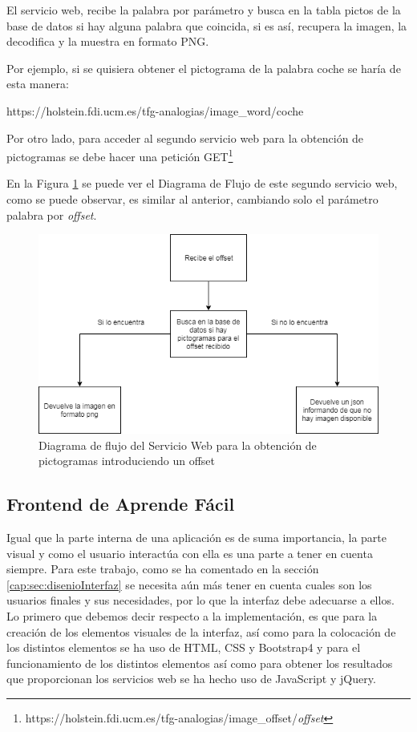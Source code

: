 El servicio web, recibe la palabra por parámetro y busca en la tabla pictos de la base de datos si hay alguna palabra que coincida, si es así, recupera la imagen, la decodifica y la muestra en formato PNG.

Por ejemplo, si se quisiera obtener el pictograma de la palabra coche se haría de esta manera:

https://holstein.fdi.ucm.es/tfg-analogias/image\_word/coche


Por otro lado, para acceder al segundo servicio web para la obtención de pictogramas se debe hacer una petición GET\footnote{https://holstein.fdi.ucm.es/tfg-analogias/image\_offset/\textit{offset}} 



En la Figura \ref{fig:swpictos_offset} se puede ver el Diagrama de Flujo de este segundo servicio web, como se puede observar, es similar al anterior, cambiando solo el parámetro palabra por \textit{offset}.

\begin{figure}[!h]
	\includegraphics[width=.9\textwidth]{Imagenes/Bitmap/Capitulo4/ServiciosWeb/pictoOffset.png}
	\centering
	\caption{Diagrama de flujo del Servicio Web para la obtención de pictogramas introduciendo un offset}
	\label{fig:swpictos_offset}
\end{figure}


\subsection{Frontend de Aprende Fácil}
Igual que la parte interna de una aplicación es de suma importancia, la parte visual y como el usuario interactúa con ella es una parte a tener en cuenta siempre. Para este trabajo, como se ha comentado en la sección \ref{cap:sec:disenioInterfaz}  se necesita aún más tener en cuenta cuales son los usuarios finales y sus necesidades, por lo que la interfaz debe adecuarse a ellos.
Lo primero que debemos decir respecto a la implementación, es que para la creación de los elementos visuales de la interfaz, así como para la colocación de los distintos elementos se ha uso de HTML, CSS y Bootstrap4 y para el funcionamiento de los distintos elementos así como para obtener los resultados que proporcionan los servicios web se ha hecho uso de JavaScript y jQuery.

